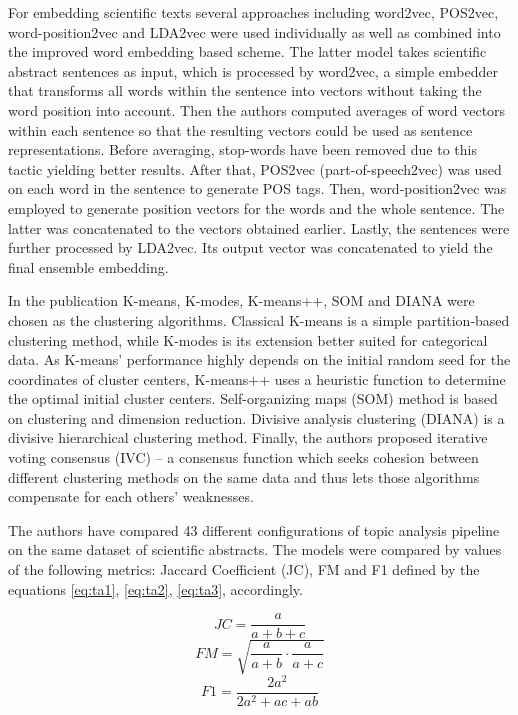 \documentclass[13pt, a4paper]{article}
\begin{document}
For embedding scientific texts several approaches including word2vec, POS2vec, word-position2vec and LDA2vec were used individually as well as combined into the improved word embedding based scheme. The latter model takes scientific abstract sentences as input, which is processed by word2vec, a simple embedder that transforms all words within the sentence into vectors without taking the word position into account. Then the authors computed averages of word vectors within each sentence so that the resulting vectors could be used as sentence representations. Before averaging, stop-words have been removed due to this tactic yielding better results. After that, POS2vec (part-of-speech2vec) was used on each word in the sentence to generate POS tags. Then, word-position2vec was employed to generate position vectors for the words and the whole sentence. The latter was concatenated to the vectors obtained earlier. Lastly, the sentences were further processed by LDA2vec. Its output vector was concatenated to yield the final ensemble embedding.

In the publication K-means, K-modes, K-means++, SOM and DIANA were chosen as the clustering algorithms. Classical K-means is a simple partition-based clustering method, while K-modes is its extension better suited for categorical data. As K-means' performance highly depends on the initial random seed for the coordinates of cluster centers, K-means++ uses a heuristic function to determine the optimal initial cluster centers. Self-organizing maps (SOM) method is based on clustering and dimension reduction. Divisive analysis clustering (DIANA) is a divisive hierarchical clustering method. Finally, the authors proposed iterative voting consensus (IVC) -- a consensus function which seeks cohesion between different clustering methods on the same data and thus lets those algorithms compensate for each others' weaknesses.

The authors have compared 43 different configurations of topic analysis pipeline on the same dataset of scientific abstracts. The models were compared by values of the following metrics: Jaccard Coefficient (JC), FM and F1 defined by the equations \ref{eq:ta1}, \ref{eq:ta2}, \ref{eq:ta3}, accordingly.

\begin{equation} \label{eq:ta1}
JC = \frac{a}{a+b+c}
\end{equation}
\begin{equation} \label{eq:ta2}
FM = \sqrt{ \frac{a}{a+b} \cdot \frac{a}{a+c} }
\end{equation}
\begin{equation} \label{eq:ta3}
F1 = \frac{2a^2}{2a^2 + ac + ab}
\end{equation}
\end{document}
